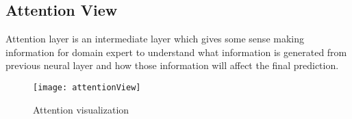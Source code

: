 \subsection{Attention View}
Attention layer is an intermediate layer which gives some sense making information for domain expert to understand what information is generated from previous neural layer and how those information will affect the final prediction.

\begin{figure*}[t]
	\centering
	\vspace{-2mm}
	\texttt{[image: attentionView]}
	\caption{Attention visualization}
	\label{fig:attentionVis}
\end{figure*}





